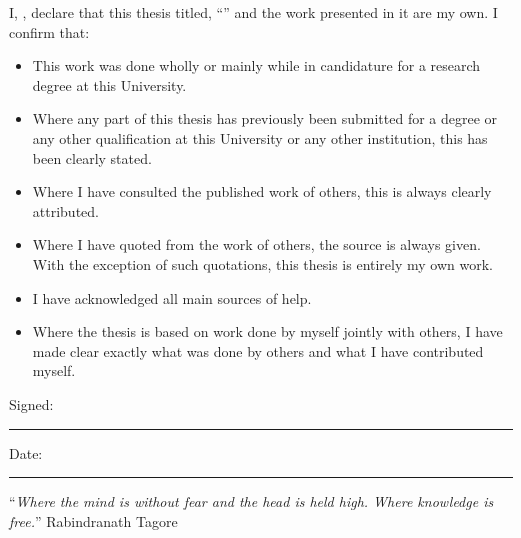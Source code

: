\documentclass[
11pt, %
oneside, %
english, %
onehalfspacing, %
nolistspacing, %
liststotoc, %
headsepline, %
consistentlayout, %
]{name} %
\begin{document}
\begin{declaration}
\addchaptertocentry{\authorshipname} %
\noindent I, \authorname, declare that this thesis titled, \enquote{\ttitle} and the work presented in it are my own. I confirm that:

\begin{itemize} 
\item This work was done wholly or mainly while in candidature for a research degree at this University.
\item Where any part of this thesis has previously been submitted for a degree or any other qualification at this University or any other institution, this has been clearly stated.
\item Where I have consulted the published work of others, this is always clearly attributed.
\item Where I have quoted from the work of others, the source is always given. With the exception of such quotations, this thesis is entirely my own work.
\item I have acknowledged all main sources of help.
\item Where the thesis is based on work done by myself jointly with others, I have made clear exactly what was done by others and what I have contributed myself.\\
\end{itemize}
 
\noindent Signed:\\
\rule[0.5em]{25em}{0.5pt} %
 \noindent Date:\\
\rule[0.5em]{25em}{0.5pt} %
\end{declaration}
\cleardoublepage

\vspace*{0.2\textheight}
\noindent\enquote{\itshape Where the mind is without fear and the head is held high. Where knowledge is free.}\bigbreak
\hfill Rabindranath Tagore
\end{document}
